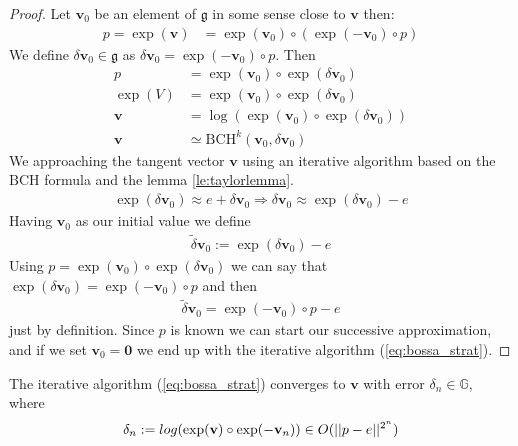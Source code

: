 \begin{proof}  
	Let $\mathbf{v}_{0}$ be an element of $\mathfrak{g}$ in some sense close to $\mathbf{v}$ then:
	\begin{align*}
	p = \exp(\mathbf{v}) &= \exp(\mathbf{v}_{0})\circ (\exp(-\mathbf{v}_{0})\circ p)
	\end{align*}
	We define $\delta \mathbf{v}_{0} \in\mathfrak{g}$ as $\delta \mathbf{v}_{0} = \exp(-\mathbf{v}_{0})\circ p$. Then
	\begin{align*}
	p &= \exp(\mathbf{v}_{0})\circ \exp(\delta \mathbf{v}_{0}) \\
	\exp(V) &= \exp(\mathbf{v}_{0})\circ \exp(\delta \mathbf{v}_{0}) \\
	\mathbf{v} &= \log(\exp(\mathbf{v}_{0})\circ \exp(\delta \mathbf{v}_{0}))\\
	\mathbf{v} &\simeq \text{BCH}^{k}(\mathbf{v}_{0},\delta \mathbf{v}_{0})
	\end{align*}
	We approaching the tangent vector $\mathbf{v}$ using an iterative algorithm based on the $\text{BCH}$ formula and the lemma \ref{le:taylorlemma}.
	\begin{align*}
	\exp(\delta \mathbf{v}_{0}) \approx e + \delta \mathbf{v}_{0} \Longrightarrow \delta \mathbf{v}_{0} \approx  \exp(\delta \mathbf{v}_{0}) - e
	\end{align*}
	Having $\mathbf{v}_{0}$ as our initial value we define
	\begin{align*}
	\tilde{\delta} \mathbf{v}_{0} := \exp(\delta \mathbf{v}_{0}) - e
	\end{align*}
	Using $p = \exp(\mathbf{v}_{0})\circ \exp(\delta \mathbf{v}_{0})$ we can say that $\exp(\delta \mathbf{v}_{0}) =  \exp(-\mathbf{v}_{0})\circ p$ and then
	\begin{align*}
	\tilde{\delta} \mathbf{v}_{0} = \exp(-\mathbf{v}_{0})\circ p - e
	\end{align*}
	just by definition. Since $p$ is known we can start our successive approximation, and if we set $\mathbf{v}_{0} = \mathbf{0}$ we end up with the iterative algorithm (\ref{eq:bossa_strat}).
\end{proof}

\begin{theorem}[Bossa]\label{th:bossa}
	The iterative algorithm (\ref{eq:bossa_strat}) converges to $\mathbf{v}$ with error $\delta_n \in \mathbb{G}$, where
	\begin{align*}
	\delta_{n} := log(\exp(\mathbf{v})\circ \exp(-\mathbf{v}_{n})) \in O(\vert\lvert p - e \rvert\vert^{2^{n}})
	\end{align*}
\end{theorem}

